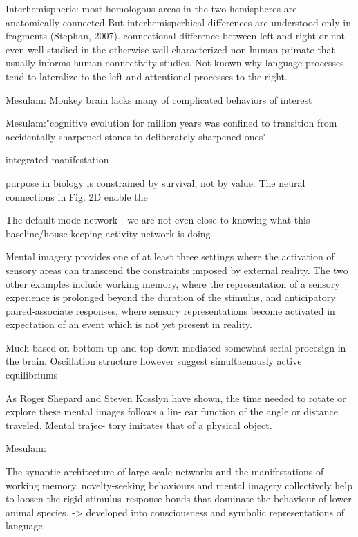 \documentclass[authoryear,review,3p]{elsarticle}
\begin{document}
Interhemispheric:
most homologous areas in the two hemispheres are anatomically connected
But interhemisperhical differences are understood only in fragments
(Stephan, 2007).
connectional difference between left and right or not even well studied
in the otherwise well-characterized non-human primate that usually
informs human connectivity studies.
Not known why language processes tend to lateralize to the left and
attentional processes to the right.












Mesulam:
Monkey brain lacks many of complicated behaviors of interest

Mesulam:"cognitive evolution for million years was confined to transition from accidentally sharpened stones to deliberately sharpened ones"


integrated manifestation

purpose in biology is constrained by survival, not by value. The neural connections in Fig. 2D enable the

The default-mode network - we are not even close to knowing
what this baseline/house-keeping activity network is doing


Mental imagery provides one of at least three settings where the activation of sensory areas can transcend the constraints imposed by external reality. The two other examples include working memory, where the representation of a sensory experience is prolonged beyond the duration of the stimulus, and anticipatory paired-associate responses, where sensory representations become activated in expectation of an event which is not yet present in reality.



Much based on bottom-up and top-down mediated somewhat serial
procesign in the brain. Oscillation structure however suggest simultaenously
active equilibriums



As Roger Shepard and Steven Kosslyn have shown, the time needed to rotate or explore these mental images follows a lin- ear function of the angle or distance traveled. Mental trajec- tory imitates that of a physical object.








Mesulam:

The synaptic architecture of large-scale networks and the manifestations of working memory, novelty-seeking behaviours and mental imagery collectively help to loosen the rigid stimulus–response bonds that dominate the behaviour of lower animal species.
-> developed into consciousness and symbolic representations of language
\end{document}
